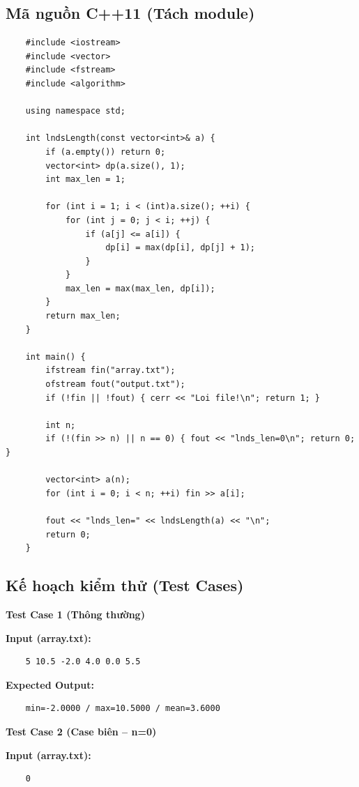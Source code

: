 \subsection{Mã nguồn C++11 (Tách module)}
    \begin{lstlisting}
    #include <iostream>
    #include <vector>
    #include <fstream>
    #include <algorithm>

    using namespace std;

    int lndsLength(const vector<int>& a) {
        if (a.empty()) return 0;
        vector<int> dp(a.size(), 1);
        int max_len = 1;
        
        for (int i = 1; i < (int)a.size(); ++i) {
            for (int j = 0; j < i; ++j) {
                if (a[j] <= a[i]) {
                    dp[i] = max(dp[i], dp[j] + 1);
                }
            }
            max_len = max(max_len, dp[i]);
        }
        return max_len;
    }

    int main() {
        ifstream fin("array.txt");
        ofstream fout("output.txt");
        if (!fin || !fout) { cerr << "Loi file!\n"; return 1; }

        int n; 
        if (!(fin >> n) || n == 0) { fout << "lnds_len=0\n"; return 0; }

        vector<int> a(n);
        for (int i = 0; i < n; ++i) fin >> a[i];

        fout << "lnds_len=" << lndsLength(a) << "\n";
        return 0;
    }
\end{lstlisting}

\subsection{Kế hoạch kiểm thử (Test Cases)}

    \textbf{Test Case 1 (Thông thường)}

    \textbf{Input (array.txt):}
    \begin{lstlisting}
    5 10.5 -2.0 4.0 0.0 5.5\end{lstlisting}

    \textbf{Expected Output:}
    \begin{lstlisting}
    min=-2.0000 / max=10.5000 / mean=3.6000\end{lstlisting}

    \vspace{0.5cm}

    \textbf{Test Case 2 (Case biên -- n=0)}

    \textbf{Input (array.txt):}
    \begin{lstlisting}
    0\end{lstlisting}

